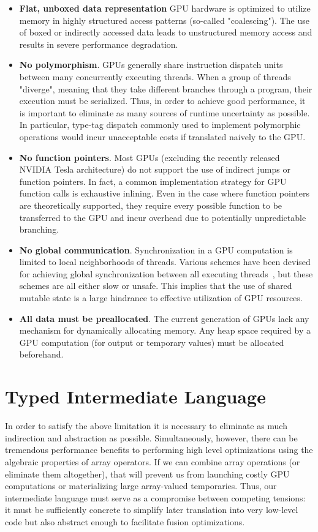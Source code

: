 \documentclass[preprint]{sigplanconf}
\begin{document}
\begin{itemize}
\item \textbf{Flat, unboxed data representation} GPU hardware is optimized to utilize memory in highly structured access patterns (so-called "coalescing"). 
The use of boxed or indirectly accessed data leads to unstructured memory access and results in severe performance degradation. 
\item \textbf{No polymorphism}. GPUs generally share instruction dispatch units between many concurrently executing threads. When a group of threads "diverge", meaning that they take different branches through a program, their execution must be serialized. Thus, in order to achieve good performance, it is important to eliminate as many sources of runtime uncertainty as possible. In particular, type-tag dispatch commonly used to implement polymorphic operations would incur unacceptable costs if translated naively to the GPU. 
\item \textbf {No function pointers}. Most GPUs (excluding the recently released NVIDIA Tesla architecture) do not support the use of indirect jumps or function pointers. In fact, a common implementation strategy for GPU function calls is exhaustive inlining. Even in the case where function pointers are theoretically supported, they require every possible function to be transferred to the GPU and incur overhead due to potentially unpredictable branching. 
\item \textbf{No global communication}. Synchronization in a GPU computation is limited to local neighborhoods of threads. Various schemes have been devised for achieving global synchronization between all executing threads~\cite{feng10}, but these schemes are all either slow or unsafe. This implies that the use of shared mutable state is a large hindrance to effective utilization of GPU resources. 
\item \textbf{All data must be preallocated}. The current generation of GPUs lack any mechanism for dynamically allocating memory. Any heap space required by a GPU computation (for output or temporary values) must be allocated beforehand. 
\end{itemize}

\section{Typed Intermediate Language}
In order to satisfy the above limitation it is necessary to eliminate as much indirection and abstraction as possible. Simultaneously, however, there can be tremendous performance benefits to performing high level optimizations using the algebraic properties of array operators. If we can combine array operations (or eliminate them altogether), that will prevent us from launching costly GPU computations or materializing large array-valued temporaries. Thus, our intermediate language must serve as a compromise between competing tensions: it must be sufficiently concrete to simplify later translation into very low-level code but also abstract enough to facilitate fusion optimizations.  \\
\end{document}
